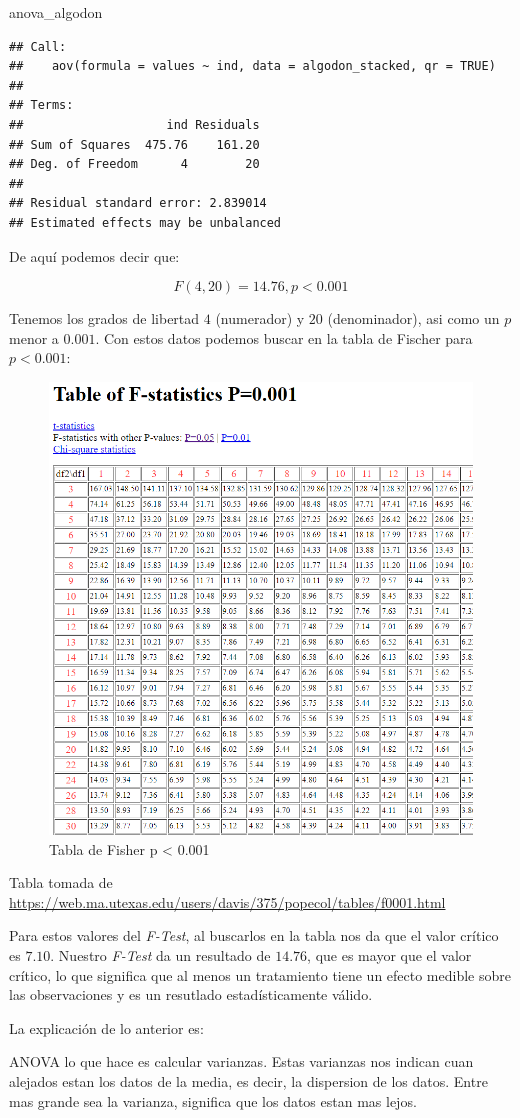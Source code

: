 \documentclass[]{article}
\newenvironment{Shaded}{\begin{snugshade}}{\end{snugshade}}
\newcommand{\NormalTok}[1]{#1}
\begin{document}
\begin{Shaded}
\begin{Highlighting}[]
\NormalTok{anova_algodon}
\end{Highlighting}
\end{Shaded}

\begin{verbatim}
## Call:
##    aov(formula = values ~ ind, data = algodon_stacked, qr = TRUE)
## 
## Terms:
##                    ind Residuals
## Sum of Squares  475.76    161.20
## Deg. of Freedom      4        20
## 
## Residual standard error: 2.839014
## Estimated effects may be unbalanced
\end{verbatim}

De aquí podemos decir que:

\[F(4,20)=14.76, p < 0.001\]

Tenemos los grados de libertad \(4\) (numerador) y \(20\) (denominador),
asi como un \(p\) menor a \(0.001\). Con estos datos podemos buscar en
la tabla de Fischer para \(p<0.001\): \renewcommand{\figurename}{Fig.}

\begin{figure}

{\centering \includegraphics[width=0.3\linewidth]{ftable001} 

}

\caption{Tabla de Fisher p < 0.001}\label{fig:unnamed-chunk-7}
\end{figure}

Tabla tomada de
\url{https://web.ma.utexas.edu/users/davis/375/popecol/tables/f0001.html}

Para estos valores del \emph{F-Test}, al buscarlos en la tabla nos da
que el valor crítico es \(7.10\). Nuestro \emph{F-Test} da un resultado
de \(14.76\), que es mayor que el valor crítico, lo que significa que al
menos un tratamiento tiene un efecto medible sobre las observaciones y
es un resutlado estadísticamente válido.

La explicación de lo anterior es:

ANOVA lo que hace es calcular varianzas. Estas varianzas nos indican
cuan alejados estan los datos de la media, es decir, la dispersion de
los datos. Entre mas grande sea la varianza, significa que los datos
estan mas lejos.
\end{document}
